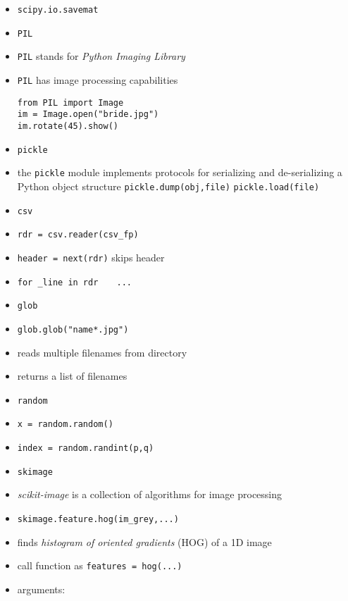 \documentclass[onecolumn]{IEEEtran} %
\begin{document}
\begin{itemize}
            \item \verb|scipy.io.savemat|
        \ei
    \ei
    \item \verb|PIL|
    \bi
        \item \verb|PIL| stands for \emph{Python Imaging Library}
        \item \verb|PIL| has image processing capabilities
\begin{verbatim}
from PIL import Image
im = Image.open("bride.jpg")
im.rotate(45).show()
\end{verbatim}
    \ei
    \item \verb|pickle|
    \bi
        \item the \verb|pickle| module implements protocols for serializing and de-serializing a Python object structure \newline
        \verb|pickle.dump(obj,file)| \newline
        \verb|pickle.load(file)|
    \ei
    \item \verb|csv|
    \bi
        \item \verb|rdr = csv.reader(csv_fp)|
        \item \verb|header = next(rdr)| skips header
        \item \verb|for _line in rdr| \newline \verb|   ...|
    \ei
    \item \verb|glob|
    \bi
        \item \verb|glob.glob("name*.jpg")|
        \bi
            \item reads multiple filenames from directory
            \item returns a list of filenames
        \ei
    \ei
    \item \verb|random|
    \bi
        \item \verb|x = random.random()|
        \item \verb|index = random.randint(p,q)|
    \ei
    \item \verb|skimage|
    \bi
        \item \emph{scikit-image} is a collection of algorithms for image processing
        \item \verb|skimage.feature.hog(im_grey,...)|
        \bi
            \item finds \emph{histogram of oriented gradients} (HOG) of a 1D image
            \item call function as \verb|features = hog(...)|
            \item arguments:
            \bi

\end{itemize}
\end{document}

